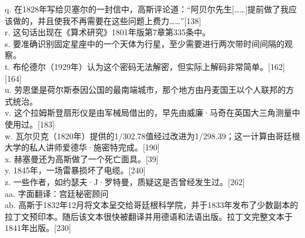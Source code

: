 q. 在1828年写给贝塞尔的一封信中，高斯评论道：“阿贝尔先生[……]提前做了我应该做的，并且使我不再需要在这些问题上费力……”[138]\\  
r. 这句话出现在《算术研究》1801年版第7章第335条中。\\  
s. 要准确识别固定星座中的一个天体为行星，至少需要进行两次带时间间隔的观察。\\  
t. 布伦德尔（1929年）认为这个密码无法解密，但实际上解码非常简单。[162][164] \\ 
u. 劳恩堡是荷尔斯泰因公国的最南端城市，那个地方由丹麦国王以个人联邦的方式统治。\\  
v. 这个拉姆斯登扇形仪是由军械局借出的，早先由威廉·马奇在英国大三角测量中使用过。[183]\\  
w. 瓦尔贝克（1820年）提供的1/302.78值经过改进为1/298.39；这一计算由哥廷根大学的私人讲师爱德华·施密特完成。[190]\\  
x. 赫塞曼还为高斯做了一个死亡面具。[39]\\ 
y. 1845年，一场雷暴损坏了电缆。[240]\\  
z. 一些作者，如约瑟夫·J·罗特曼，质疑这是否曾经发生过。[262]\\  
aa. 字面翻译：宫廷秘密顾问\\  
ab. 高斯于1832年12月将文本呈交给哥廷根科学院，并于1833年发布了少数副本的拉丁文预印本。随后该文本很快被翻译并用德语和法语出版。拉丁文完整文本于1841年出版。[230]\\
